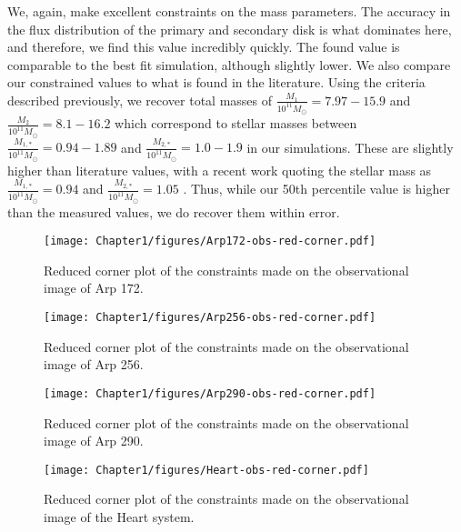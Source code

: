 We, again, make excellent constraints on the mass parameters. The accuracy in the flux distribution of the primary and secondary disk is what dominates here, and therefore, we find this value incredibly quickly. The found value is comparable to the best fit simulation, although slightly lower. We also compare our constrained values to what is found in the literature. Using the criteria described previously, we recover total masses of $\frac{M_{1}}{10^{11}M_{\odot}} = 7.97 - 15.9$ and $\frac{M_{2}}{10^{11}M_{\odot}} = 8.1 - 16.2$ which correspond to stellar masses between $\frac{M_{1,*}}{10^{11}M_{\odot}} = 0.94 - 1.89$ and $\frac{M_{2, *}}{10^{11}M_{\odot}} = 1.0 - 1.9$ in our simulations. These are slightly higher than literature values, with a recent work quoting the stellar mass as $\frac{M_{1, *}}{10^{11}M_{\odot}} = 0.94 $ and $\frac{M_{2, *}}{10^{11}M_{\odot}} = 1.05$ \citep{2020MNRAS.496.5243H}. Thus, while our 50th percentile value is higher than the measured values, we do recover them within error.

\begin{figure*}
\centering
\texttt{[image: Chapter1/figures/Arp172-obs-red-corner.pdf]}
\caption[Reduced corner plot of the constraints made on the observational image of Arp 172.]{Reduced corner plot of the constraints made on the observational image of Arp 172.}
\label{fig:Arp172-obs}
\end{figure*}

\begin{figure*}
\centering
\texttt{[image: Chapter1/figures/Arp256-obs-red-corner.pdf]}
\caption[Reduced corner plot of the constraints made on the observational image of Arp 256.]{Reduced corner plot of the constraints made on the observational image of Arp 256.}
\label{fig:Arp290-obs}
\end{figure*}

\begin{figure*}
\centering
\texttt{[image: Chapter1/figures/Arp290-obs-red-corner.pdf]}
\caption[Reduced corner plot of the constraints made on the observational image of Arp 290.]{Reduced corner plot of the constraints made on the observational image of Arp 290. }
\label{fig:Arp256-obs}
\end{figure*}

\begin{figure*}
\centering
\texttt{[image: Chapter1/figures/Heart-obs-red-corner.pdf]}
\caption[Reduced corner plot of the constraints made on the observational image of the Heart system.]{Reduced corner plot of the constraints made on the observational image of the Heart system.}
\label{fig:Heart-obs}
\end{figure*}


